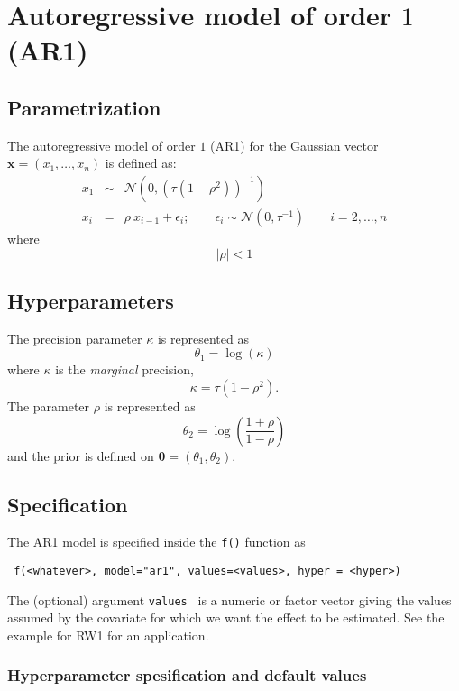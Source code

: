 \documentclass[a4paper,11pt]{article}
\begin{document}
\section*{Autoregressive model of order $1$ (AR1)}

\subsection*{Parametrization}

The autoregressive model of order $1$ (AR1) for the Gaussian vector
$\mathbf{x}=(x_1,\dots,x_n)$ is defined as:
\begin{eqnarray}\nonumber
    x_1&\sim&\mathcal{N}(0,(\tau(1-\rho^2))^{-1}) \\\nonumber
    x_i&=&\rho\ x_{i-1}+\epsilon_i; \qquad \epsilon_i\sim\mathcal{N}(0,\tau^{-1}) \qquad  i=2,\dots,n
\end{eqnarray}
where
\[
|\rho|<1
\]

\subsection*{Hyperparameters}

The precision parameter $\kappa$ is represented as
\begin{displaymath}
    \theta_1 =\log(\kappa) 
\end{displaymath}
where $\kappa$ is the \emph{marginal} precision,
\begin{displaymath}
    \kappa = \tau (1-\rho^{2}).
\end{displaymath}
The parameter $\rho$ is represented as
\[
\theta_2 = \log\left(\frac{1+\rho}{1-\rho}\right)
\]
and the prior is defined on $\mathbf{\theta}=(\theta_1,\theta_2)$. 

\subsection*{Specification}

The AR1 model is specified inside the {\tt f()} function as
\begin{verbatim}
 f(<whatever>, model="ar1", values=<values>, hyper = <hyper>)
\end{verbatim}
The (optional) argument {\tt values } is a numeric or factor vector
giving the values assumed by the covariate for which we want the
effect to be estimated. See the example for RW1 for an application.

\subsubsection*{Hyperparameter spesification and default values}

\end{document}

